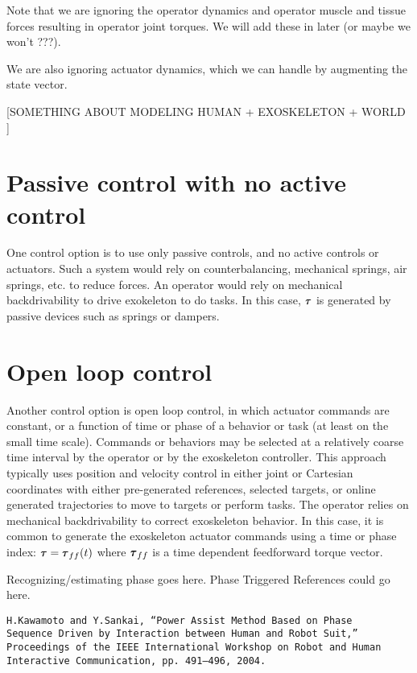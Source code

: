 \documentclass[letterpaper,12pt,fullpage]{article}
\begin{document}
Note that we are ignoring the operator dynamics and operator muscle and tissue
forces resulting in operator joint torques. We will add these in later (or maybe
we won't ???).

We are also ignoring actuator dynamics, which we can handle by augmenting 
the state vector.

[SOMETHING ABOUT MODELING HUMAN + EXOSKELETON + WORLD ]

\section{Passive control with no active control}

One control option is to use only passive controls, and no active controls
or actuators.
Such a system would rely on counterbalancing, mechanical springs, air springs, etc.
to reduce forces. 
An operator would rely on mechanical backdrivability to drive
exokeleton to do tasks.
In this case, 
$\vtau$ is generated by passive devices such as springs or dampers.

\section{Open loop control}

Another control option is open loop control, in which actuator commands are
constant, or a function of time or phase of a behavior or task
(at least on the small time scale).
Commands or behaviors may be selected at a relatively coarse time interval
by the operator or by the exoskeleton controller.
This approach typically 
uses position and velocity control in either joint or
Cartesian coordinates
with either pre-generated references, selected targets,
or online generated trajectories to move to targets or perform tasks.
The operator relies on mechanical backdrivability 
to correct exoskeleton behavior.
In this case, it is common to generate the exoskeleton actuator commands using
a time or phase index:
$\vtau = \vtau_{ff}(t)$ where $\vtau_{ff}$ is a time
dependent feedforward torque vector.

Recognizing/estimating phase goes here.
Phase Triggered References could go here.
\begin{verbatim}
H.Kawamoto and Y.Sankai, “Power Assist Method Based on Phase
Sequence Driven by Interaction between Human and Robot Suit,”
Proceedings of the IEEE International Workshop on Robot and Human
Interactive Communication, pp. 491–496, 2004.
\end{verbatim}
\end{document}
